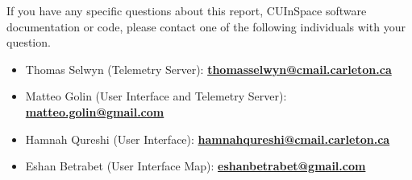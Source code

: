 If you have any specific questions about this report, CUInSpace software documentation or code, please contact one of the 
following individuals with your question.

\begin{itemize}
    \item Thomas Selwyn (Telemetry Server): \href{mailto:thomasselwyn@cmail.carleton.ca?subject=Question regarding CU InSpace Software}{\textbf{thomasselwyn@cmail.carleton.ca}}
    \item Matteo Golin (User Interface and Telemetry Server): \href{mailto:matteo.golin@gmail.com?subject=Question regarding CU InSpace Software}{\textbf{matteo.golin@gmail.com}}
    \item Hamnah Qureshi (User Interface): \href{mailto:hamnahqureshi@cmail.carleton.ca?subject=Question regarding CU InSpace Software}{\textbf{hamnahqureshi@cmail.carleton.ca}}
    \item Eshan Betrabet (User Interface Map): \href{mailto:eshanbetrabet@gmail.com?subject=Question regarding CU InSpace Software}{\textbf{eshanbetrabet@gmail.com}}
\end{itemize}
